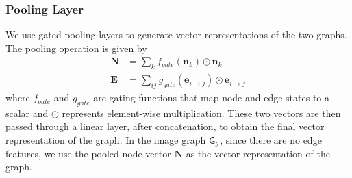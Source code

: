 \documentclass[final]{cvpr}
\newcommand{\imagerep}{\mathcal{I}}
\newcommand{\imagegraph}{$\mathsf{G}_{\imagerep}$}
\begin{document}
\subsubsection{Pooling Layer}
We use gated pooling layers to generate vector representations of the two graphs. The pooling operation is given by
\begin{align}
    \mathbf{N} &= \sum_{k} f_{gate}(\mathbf{n}_{k}) \odot \mathbf{n}_{k} \\
    \mathbf{E} &= \sum_{ij} g_{gate}(\mathbf{e}_{i \rightarrow j}) \odot \mathbf{e}_{i \rightarrow j}
\end{align}
where $f_{gate}$ and $g_{gate}$ are gating functions that map node and edge states to a scalar and $\odot$ represents element-wise multiplication. These two vectors are then passed through a linear layer, after concatenation, to obtain the final vector representation of the graph. In the image graph \imagegraph, since there are no edge features, we use the pooled node vector $\mathbf{N}$ as the vector representation of the graph. 
\renewcommand{\arraystretch}{1.1}
\end{document}
